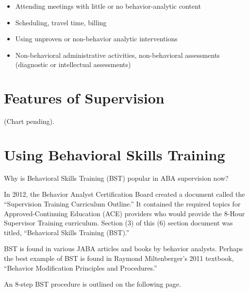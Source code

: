 \begin{itemize}
\item Attending meetings with little or no behavior-analytic content
\item Scheduling, travel time, billing
\item Using unproven or non-behavior analytic interventions 
\item Non-behavioral administrative activities, non-behavioral assessments (diagnostic or intellectual assessments)
\end{itemize}

\section{Features of Supervision}
(Chart pending).
%
%
%
\section{Using Behavioral Skills Training}
%
Why is Behavioral Skills Training (BST) popular in ABA supervision now?

In 2012, the Behavior Analyst Certification Board\textregistered{} created a document called the ``Supervision Training Curriculum Outline.'' It contained the required topics for Approved-Continuing Education (ACE) providers who would provide the 8-Hour Supervisor Training curriculum. Section (3) of this (6) section document was titled, ``Behavioral Skills Training (BST).'' 

BST is found in various JABA articles and books by behavior analysts. Perhaps the best example of BST is found in Raymond Miltenberger's 2011 textbook, ``Behavior Modification Principles and Procedures.'' 

An 8-step BST procedure is outlined on the following page.
%
%
